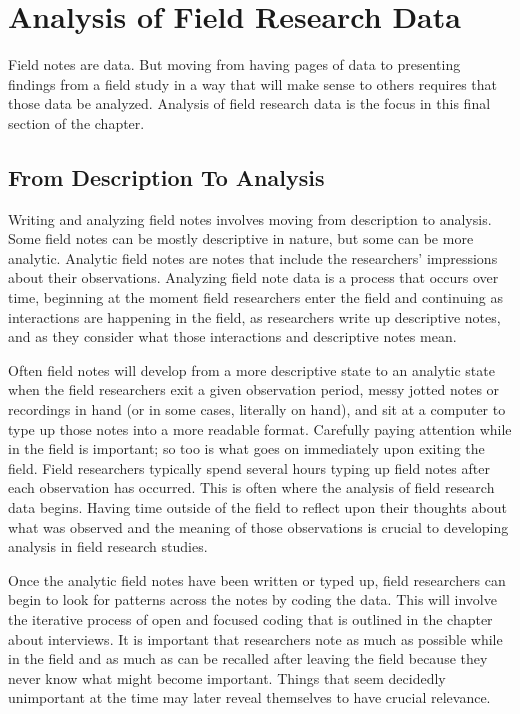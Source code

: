 \section{Analysis of Field Research Data}

Field notes are data. But moving from having pages of data to presenting findings from a field study in a way that will make sense to others requires that those data be analyzed. Analysis of field research data is the focus in this final section of the chapter.

\subsection{From Description To Analysis}

Writing and analyzing field notes involves moving from description to analysis. Some field notes can be mostly descriptive in nature, but some can be more analytic. Analytic field notes are notes that include the researchers' impressions about their observations. Analyzing field note data is a process that occurs over time, beginning at the moment field researchers enter the field and continuing as interactions are happening in the field, as researchers write up descriptive notes, and as they consider what those interactions and descriptive notes mean.

Often field notes will develop from a more descriptive state to an analytic state when the field researchers exit a given observation period, messy jotted notes or recordings in hand (or in some cases, literally on hand), and sit at a computer to type up those notes into a more readable format. Carefully paying attention while in the field is important; so too is what goes on immediately upon exiting the field. Field researchers typically spend several hours typing up field notes after each observation has occurred. This is often where the analysis of field research data begins. Having time outside of the field to reflect upon their thoughts about what was observed and the meaning of those observations is crucial to developing analysis in field research studies.

Once the analytic field notes have been written or typed up, field researchers can begin to look for patterns across the notes by coding the data. This will involve the iterative process of open and focused coding that is outlined in the chapter about interviews. It is important that researchers note as much as possible while in the field and as much as can be recalled after leaving the field because they never know what might become important. Things that seem decidedly unimportant at the time may later reveal themselves to have crucial relevance.

